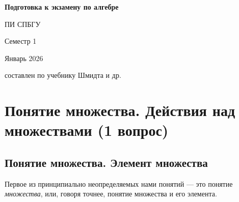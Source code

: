 \documentclass[a4paper,12pt]{article}
\theoremstyle{definition}
\theoremstyle{plain}
\theoremstyle{remark}
\begin{document}
	
	
	
	
	\begin{titlepage}
		
		\centering
		
		{\LARGE\bfseries Подготовка к экзамену по алгебре\par}
		
		\vspace{0.5cm}
		
		{\Large ПИ СПБГУ\par}
		
		\vspace{0.3cm}
		
		{\Large Семестр 1\par}
		
		
		
		\vspace{2cm}
		
		
		
		
		
		{\large Январь 2026\par}
		
		
		
		\vfill
		
		
		
		{\footnotesize составлен по учебнику Шмидта и др.\par}
		
	\end{titlepage}
	
	
	
	\newpage
	
	\tableofcontents
	
	
	
	\newpage
	\section{Понятие множества. Действия над множествами (1 вопрос)}
	
	\subsection{Понятие множества. Элемент множества }
	
	Первое из принципиально неопределяемых нами понятий — это понятие \textit{множества}, или, говоря точнее, понятие множества и его элемента.
	
	\medskip
	
	\smallskip
	
\end{document}
